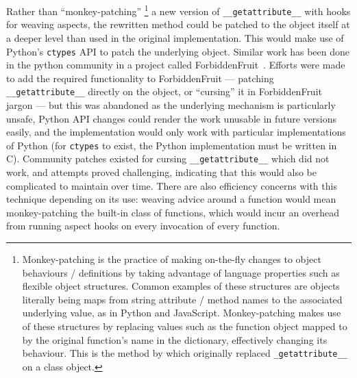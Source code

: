 Rather than ``monkey-patching''
\footnote{
Monkey-patching is the practice of making on-the-fly changes to object
behaviours / definitions by taking advantage of language properties such as
flexible object structures. Common examples of these structures are objects
literally being maps from string attribute / method names to the associated
underlying value, as in Python and JavaScript. Monkey-patching makes use of
these structures by replacing values such as the function object mapped to by
the original function's name in the dictionary, effectively changing its
behaviour. This is the method by which \pdsf{} originally replaced
\lstinline{_getattribute__} on a class object.
}
a new version of \lstinline{__getattribute__} with hooks for weaving aspects,
the rewritten method could be patched to the object itself at a deeper level
than used in the original \pdsf{} implementation. This would make use of
Python's \lstinline{ctypes} API to patch the underlying object. Similar work has
been done in the python community in a project called
ForbiddenFruit~\cite{forbiddenfruit_repo}.  Efforts were made to add the
required functionality to ForbiddenFruit --- patching
\lstinline{__getattribute__} directly on the object, or ``cursing'' it in
ForbiddenFruit jargon --- but this was abandoned as the underlying mechanism is
particularly unsafe, Python API changes could render the work unusable in future
versions easily, and the implementation would only work with particular
implementations of Python (for \lstinline{ctypes} to exist, the Python
implementation must be written in C). Community patches existed for cursing
\lstinline{__getattribute__} which did not work, and attempts proved
challenging, indicating that this would also be complicated to maintain over
time. There are also efficiency concerns with this technique depending on its
use: weaving advice around a function would mean monkey-patching the built-in
class of functions, which would incur an overhead from running aspect hooks on
every invocation of every function.

